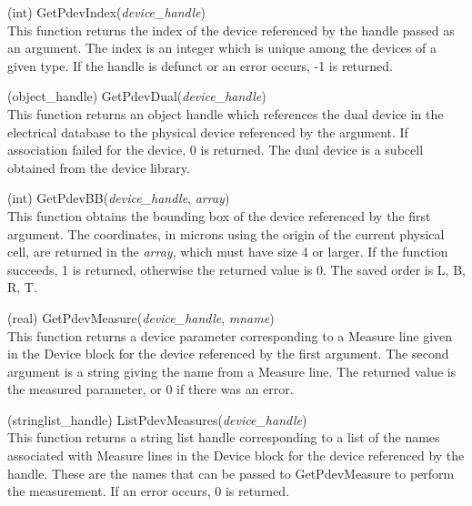 \begin{description}
\item{(int) \vt GetPdevIndex({\it device\_handle\/})}\\
This function returns the index of the device referenced by the handle
passed as an argument.  The index is an integer which is unique among
the devices of a given type.  If the handle is defunct or an error
occurs, -1 is returned.

\item{(object\_handle) \vt GetPdevDual({\it device\_handle\/})}\\
This function returns an object handle which references the dual
device in the electrical database to the physical device referenced by
the argument.  If association failed for the device, 0 is returned. 
The dual device is a subcell obtained from the device library.

\item{(int) \vt GetPdevBB({\it device\_handle}, {\it array\/})}\\
This function obtains the bounding box of the device referenced by the
first argument.  The coordinates, in microns using the origin of the
current physical cell, are returned in the {\it array}, which must
have size 4 or larger.  If the function succeeds, 1 is returned,
otherwise the returned value is 0.  The saved order is L, B, R, T.

\item{(real) \vt GetPdevMeasure({\it device\_handle}, {\it mname\/})}\\
This function returns a device parameter corresponding to a {\vt
Measure} line given in the Device block for the device referenced by
the first argument.  The second argument is a string giving the name
from a {\vt Measure} line.  The returned value is the measured
parameter, or 0 if there was an error.

\item{(stringlist\_handle) \vt ListPdevMeasures({\it device\_handle\/})}\\
This function returns a string list handle corresponding to a list of
the names associated with {\vt Measure} lines in the Device block for
the device referenced by the handle.  These are the names that can be
passed to {\vt GetPdevMeasure} to perform the measurement.  If an error
occurs, 0 is returned.


\end{description}
